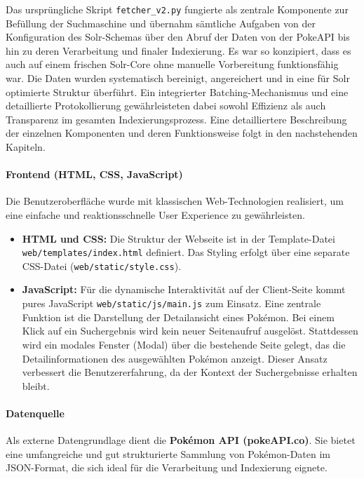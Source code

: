 Das ursprüngliche Skript \texttt{fetcher\_v2.py} fungierte als zentrale Komponente zur Befüllung der Suchmaschine und übernahm sämtliche Aufgaben von der Konfiguration des Solr-Schemas über den Abruf der Daten von der PokeAPI bis hin zu deren Verarbeitung und finaler Indexierung. Es war so konzipiert, dass es auch auf einem frischen Solr-Core ohne manuelle Vorbereitung funktionsfähig war. Die Daten wurden systematisch bereinigt, angereichert und in eine für Solr optimierte Struktur überführt. Ein integrierter Batching-Mechanismus und eine detaillierte Protokollierung gewährleisteten dabei sowohl Effizienz als auch Transparenz im gesamten Indexierungsprozess. Eine detailliertere Beschreibung der einzelnen Komponenten und deren Funktionsweise folgt in den nachstehenden Kapiteln.

\paragraph{Frontend (HTML, CSS, JavaScript)}
Die Benutzeroberfläche wurde mit klassischen Web-Technologien realisiert, um eine einfache und reaktionsschnelle User Experience zu gewährleisten.
\begin{itemize}
    \item \textbf{HTML und CSS:} Die Struktur der Webseite ist in der Template-Datei \texttt{web/templates/index.html} definiert. Das Styling erfolgt über eine separate CSS-Datei (\texttt{web/static/style.css}).
    
    \item \textbf{JavaScript:} Für die dynamische Interaktivität auf der Client-Seite kommt pures JavaScript \texttt{web/\allowbreak static/\allowbreak js/\allowbreak main.js} zum Einsatz. Eine zentrale Funktion ist die Darstellung der Detailansicht eines Pokémon. Bei einem Klick auf ein Suchergebnis wird kein neuer Seitenaufruf ausgelöst. Stattdessen wird ein modales Fenster (Modal) über die bestehende Seite gelegt, das die Detailinformationen des ausgewählten Pokémon anzeigt. Dieser Ansatz verbessert die Benutzererfahrung, da der Kontext der Suchergebnisse erhalten bleibt.
\end{itemize}

\paragraph{Datenquelle}
Als externe Datengrundlage dient die \textbf{Pokémon API (pokeAPI.co)}. Sie bietet eine umfangreiche und gut strukturierte Sammlung von Pokémon-Daten im JSON-Format, die sich ideal für die Verarbeitung und Indexierung eignete.

